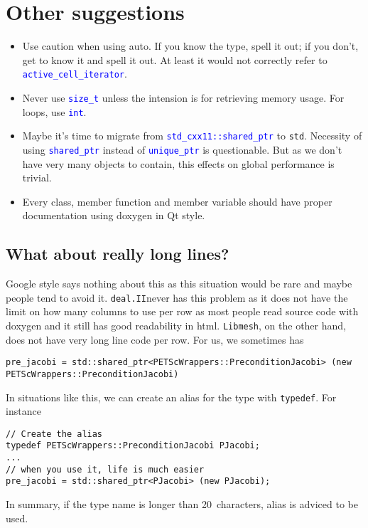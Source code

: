 \documentclass{article}
\newcommand{\libmesh}{{\tt Libmesh}}
\newcommand{\dealii}{{\tt deal.II}}
\newcommand{\blue}[1]{\textcolor{blue}{#1}}
\begin{document}
\section{Other suggestions}
\begin{itemize}
	\item Use caution when using auto. If you know the type, spell it out; if you don't, get to know it and spell it out. At least it would not correctly refer to {\tt \blue{active\_cell\_iterator}}.
	\item Never use {\tt \blue{size\_t}} unless the intension is for retrieving memory usage. For loops, use {\tt \blue{int}}.
	\item Maybe it's time to migrate from {\tt \blue{std\_cxx11::shared\_ptr}} to {\tt std}. Necessity of using {\tt \blue{shared\_ptr}} instead of {\tt \blue{unique\_ptr}} is questionable. But as we don't have very many objects to contain, this effects on global performance is trivial.
	\item Every class, member function and member variable should have proper documentation using doxygen in Qt style.
\end{itemize}
\subsection{What about really long lines?}
Google style says nothing about this as this situation would be rare and maybe people tend to avoid it. \dealii never has this problem as it does not have the limit on how many columns to use per row as most people read source code with doxygen and it still has good readability in html. \libmesh, on the other hand, does not have very long line code per row. For us, we sometimes has
\begin{lstlisting}
pre_jacobi = std::shared_ptr<PETScWrappers::PreconditionJacobi> (new PETScWrappers::PreconditionJacobi)
\end{lstlisting}

In situations like this, we can create an alias for the type with {\tt typedef}. For instance
\begin{lstlisting}
// Create the alias
typedef PETScWrappers::PreconditionJacobi PJacobi;
...
// when you use it, life is much easier
pre_jacobi = std::shared_ptr<PJacobi> (new PJacobi);
\end{lstlisting}

In summary, if the type name is longer than 20\ characters, alias is adviced to be used.
\end{document}
